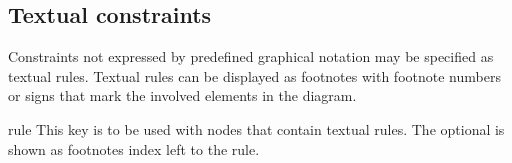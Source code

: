 \documentclass[a4paper,10pt]{article}
\begin{document}
\begin{codeexample}[]
\end{codeexample}



\subsection{Textual constraints}
Constraints not expressed by predefined graphical notation may be specified as textual rules. Textual rules can be displayed as footnotes with footnote numbers or signs that mark the involved elements in the diagram.

\begin{stylekey}{rule}
This key is to be used with nodes that contain textual rules. The optional  is shown as footnotes index left to the rule.
\begin{codeexample}[]
\end{codeexample}
\end{stylekey}
\end{document}
